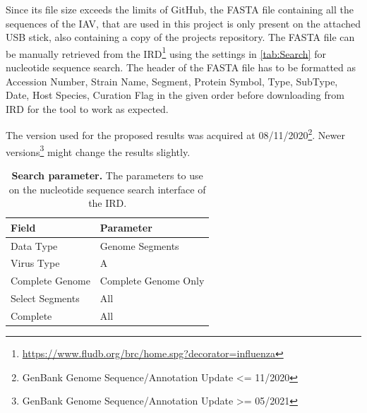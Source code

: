 Since its file size exceeds the limits of GitHub, the FASTA file containing all the sequences of the \gls{IAV}, that are used in this project is only present on the attached USB stick, also containing a copy of the projects repository. The FASTA file can be manually retrieved from the \gls{IRD}\footnote{\url{https://www.fludb.org/brc/home.spg?decorator=influenza}} using the settings in \autoref{tab:Search} for nucleotide sequence search. The header of the FASTA file has to be formatted as Accession Number, Strain Name, Segment, Protein Symbol, Type, SubType, Date, Host Species, Curation Flag in the given order before downloading from \gls{IRD} for the tool to work as expected.

\vspace{1em}

The version used for the proposed results was acquired at 08/11/2020\footnote{GenBank Genome Sequence/Annotation Update <= 11/2020}. Newer versions\footnote{GenBank Genome Sequence/Annotation Update >= 05/2021} might change the results slightly.

\begin{table}[!hbt]
    \footnotesize
    \centering
    \caption[Search parameter]{\textbf{Search parameter.} The parameters to use on the nucleotide sequence search interface of the \gls{IRD}.}
    \label{tab:Search}
    \begin{tabular*}{0.5\textwidth}{@{\extracolsep{\fill}\hspace{6pt}}ll}
        \toprule
        \textbf{Field} & \textbf{Parameter}\\
        \midrule
        Data Type & Genome Segments\\
        Virus Type & A\\
        Complete Genome & Complete Genome Only\\
        Select Segments & All\\
        Complete & All\\
        \bottomrule
    \end{tabular*}
\end{table}

